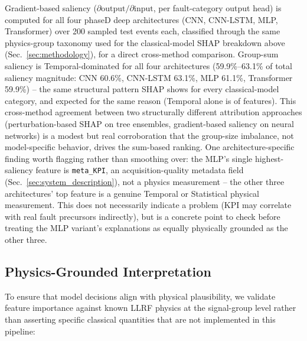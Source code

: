 Gradient-based saliency ($\partial\text{output}/\partial\text{input}$, per fault-category output head) is computed for all four phaseD deep architectures (CNN, CNN-LSTM, MLP, Transformer) over 200 sampled test events each, classified through the same physics-group taxonomy used for the classical-model SHAP breakdown above (Sec.~\ref{sec:methodology}), for a direct cross-method comparison. Group-sum saliency is Temporal-dominated for all four architectures (59.9\%--63.1\% of total saliency magnitude: CNN 60.6\%, CNN-LSTM 63.1\%, MLP 61.1\%, Transformer 59.9\%) %
-- the same structural pattern SHAP shows for every classical-model category, and expected for the same reason (Temporal alone is \MetricOneZeroPhysicsGroupShapNFeaturesTemporal{} of \MetricZeroSixBinaryClassificationNFeatures{} features). This cross-method agreement between two structurally different attribution approaches (perturbation-based SHAP on tree ensembles, gradient-based saliency on neural networks) is a modest but real corroboration that the group-size imbalance, not model-specific behavior, drives the sum-based ranking. One architecture-specific finding worth flagging rather than smoothing over: the MLP's single highest-saliency feature is \texttt{meta\_KPI}, an acquisition-quality metadata field (Sec.~\ref{sec:system_description}), not a physics measurement -- the other three architectures' top feature is a genuine Temporal or Statistical physical measurement. This does not necessarily indicate a problem (KPI may correlate with real fault precursors indirectly), but is a concrete point to check before treating the MLP variant's explanations as equally physically grounded as the other three.

\subsection{Physics-Grounded Interpretation}

To ensure that model decisions align with physical plausibility, we validate feature importance against known LLRF physics at the signal-group level rather than asserting specific classical quantities that are not implemented in this pipeline:


